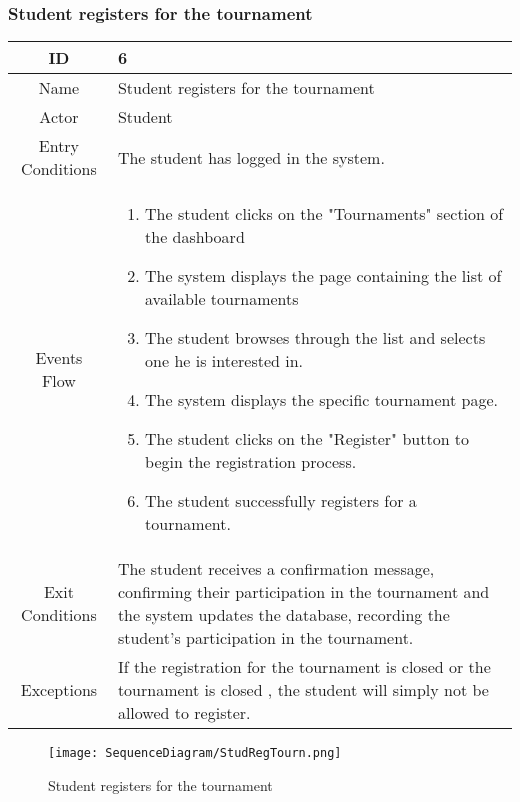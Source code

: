 \subsubsection{Student registers for the tournament}
\begin{longtable}{|c| p{10cm}|}
        \hline
            ID & 6 \\
        \hline
            Name & Student registers for the tournament  \\
        \hline
            Actor & Student \\
        \hline
            Entry Conditions & 
                          
                        The student  has logged in the system.\\
                                   
                    
        \hline
            Events Flow &   \begin{enumerate}
            
                                \item The student clicks on the "Tournaments" section of the dashboard
                                \item The system displays the page containing the list of available tournaments
                                \item The student browses through the list  and selects one he is interested in.
                                \item The system displays the specific tournament page.
                                \item The student clicks on the "Register" button to begin the registration process. 
                                \item The student successfully registers for a tournament.
                                
                            \end{enumerate} \\
        \hline
            Exit Conditions &
 
                                    The student receives a confirmation message, confirming their participation in the tournament and the system updates the database, recording the student’s participation in the tournament.
                                \\
        \hline
            Exceptions & 
                 If the registration for the tournament is closed or the tournament is closed , the student will simply not be allowed to register.
            \\
        \hline
    \end{longtable}
    \begin{figure}[H]
  \texttt{[image: SequenceDiagram/StudRegTourn.png]} 
  \caption{Student registers for the tournament}
  \label{fig:immagine}
\end{figure}

